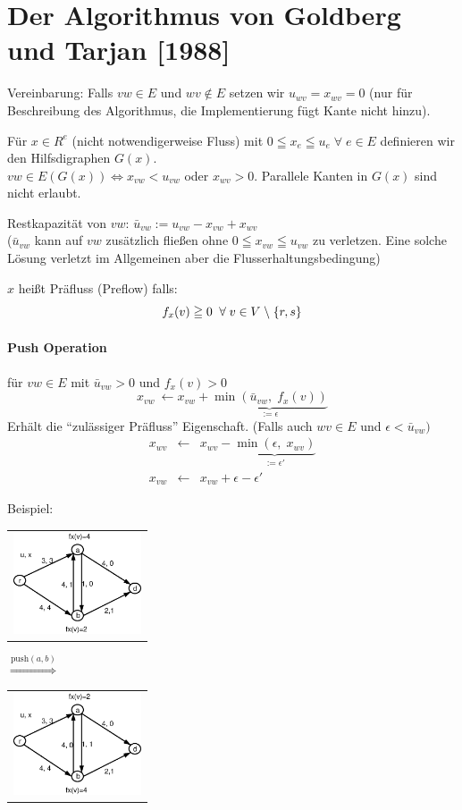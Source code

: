 \section{Der Algorithmus von Goldberg und Tarjan [1988]}
Vereinbarung: Falls $v w \in E$ und $ w v \not\in E$ setzen wir $u_{w v} =
x_{w v}=0$ (nur für Beschreibung des Algorithmus, die Implementierung fügt
Kante nicht hinzu).

Für $x \in R^{e}$ (nicht notwendigerweise Fluss) mit $0 \leqq x_{e} \leqq
u_{e} \; \forall \; e \in E$ definieren wir den Hilfsdigraphen $G(x)$.\\
$v w \in E(G(x)) \Leftrightarrow x_{v w} < u_{v w}$ oder $x_{w v} > 0$.
Parallele Kanten in $G(x)$ sind nicht erlaubt.

Restkapazität von $v w$: $\bar{u}_{v w} := u_{v w } - x_{v w} + x_{w v}$\\
($\bar{u}_{v w}$ kann auf $v w$ zusätzlich fließen ohne $0 \leqq x_{v w}
\leqq u_{v w}$ zu verletzen. Eine solche Lösung verletzt im Allgemeinen aber
die Flusserhaltungsbedingung)

$x$ heißt Präfluss (Preflow) falls:
\[f_{x}(v) \geqq 0 \; \; \forall \; v \in V \;\backslash\; \{r,s\}\]

\paragraph{Push Operation} für $v w \in E$ mit $\bar{u}_{v w} > 0$ und
$f_{x}(v)>0$ 
\[x_{v w}\ \leftarrow x_{v w} + \underbrace{\min (\bar{u}_{v w},\; f_{x}(v))
}_{:= \epsilon}\]
Erhält die "`zulässiger Präfluss"' Eigenschaft. (Falls auch $w v \in E$ und
$\epsilon < \bar{u}_{v w })$\\
\[\begin{array}{rcl}
x_{w v} &\leftarrow& x_{w v} - \underbrace{\min(\epsilon, \; x_{w v})}_{ :=
\epsilon'}\\
x_{v w} &\leftarrow & x_{v w} + \epsilon - \epsilon'\end{array}
\]

Beispiel:

\begin{tabular}{l}
\includegraphics[height=3cm]{bilder/3-0Praefluss1}
\end{tabular}
$\stackrel{\mbox{push}(a,b)}{\Longrightarrow}$
\begin{tabular}{l}
\includegraphics[height=3cm]{bilder/3-0Praefluss2}
\end{tabular}


